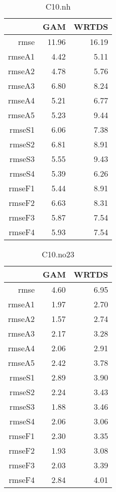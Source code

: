 \documentclass[12pt]{amsart}
\begin{document}
\begin{table}[H]
\centering
\begin{tabular}{rrr}
  \hline
 & GAM & WRTDS \\ 
  \hline
rmse & 11.96 & 16.19 \\ 
  rmseA1 & 4.42 & 5.11 \\ 
  rmseA2 & 4.78 & 5.76 \\ 
  rmseA3 & 6.80 & 8.24 \\ 
  rmseA4 & 5.21 & 6.77 \\ 
  rmseA5 & 5.23 & 9.44 \\ 
  rmseS1 & 6.06 & 7.38 \\ 
  rmseS2 & 6.81 & 8.91 \\ 
  rmseS3 & 5.55 & 9.43 \\ 
  rmseS4 & 5.39 & 6.26 \\ 
  rmseF1 & 5.44 & 8.91 \\ 
  rmseF2 & 6.63 & 8.31 \\ 
  rmseF3 & 5.87 & 7.54 \\ 
  rmseF4 & 5.93 & 7.54 \\ 
   \hline
\end{tabular}
\caption{C10.nh}
\end{table}


\begin{table}[H]
\centering
\begin{tabular}{rrr}
  \hline
 & GAM & WRTDS \\ 
  \hline
rmse & 4.60 & 6.95 \\ 
  rmseA1 & 1.97 & 2.70 \\ 
  rmseA2 & 1.57 & 2.74 \\ 
  rmseA3 & 2.17 & 3.28 \\ 
  rmseA4 & 2.06 & 2.91 \\ 
  rmseA5 & 2.42 & 3.78 \\ 
  rmseS1 & 2.89 & 3.90 \\ 
  rmseS2 & 2.24 & 3.43 \\ 
  rmseS3 & 1.88 & 3.46 \\ 
  rmseS4 & 2.06 & 3.06 \\ 
  rmseF1 & 2.30 & 3.35 \\ 
  rmseF2 & 1.93 & 3.08 \\ 
  rmseF3 & 2.03 & 3.39 \\ 
  rmseF4 & 2.84 & 4.01 \\ 
   \hline
\end{tabular}
\caption{C10.no23}
\end{table}
\end{document}
